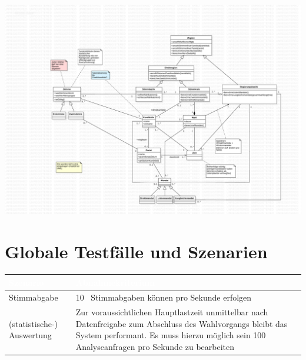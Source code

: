 \documentclass[a4paper,12pt]{article}
\begin{document}
\begin{center}
	\includegraphics[width=\textwidth]{../model.pdf}
\end{center}

\section{Globale Testfälle und Szenarien}
\begin{center}
      \begin{tabular}{|m{3.5cm}|m{12cm}|}
        \hline
        \rowcolor{TUMBlue} \textcolor{white}{\textbf{Szenario}} & \textcolor{white}{\textbf{Abnahmekriterium}} \\
        \hline
        Stimmabgabe & 10~ Stimmabgaben können pro Sekunde erfolgen \\
        \hline
        (statistische-) Auswertung & Zur voraussichtlichen Hauptlastzeit unmittelbar nach Datenfreigabe zum Abschluss des Wahlvorgangs 
            bleibt das System performant. Es muss hierzu möglich sein 100 Analyseanfragen pro Sekunde zu bearbeiten \\
        \hline
      \end{tabular}
\end{center}

\clearpage

\end{document}
